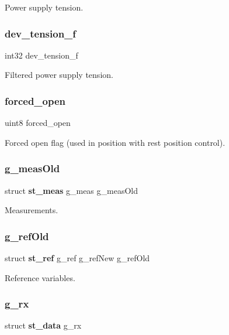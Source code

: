 Power supply tension. \mbox{\label{globals_8c_a600f1f02d397d3ffd8b03b8a4edace02}} 
\subsubsection{dev\+\_\+tension\+\_\+f}
{\footnotesize\ttfamily int32 dev\+\_\+tension\+\_\+f}

Filtered power supply tension. \mbox{\label{globals_8c_a0f13b80a0c329fa3176eb1e72ef36fb8}} 
\subsubsection{forced\+\_\+open}
{\footnotesize\ttfamily uint8 forced\+\_\+open}

Forced open flag (used in position with rest position control). \mbox{\label{globals_8c_a47c3980e6bddec492ca4315e36602ba0}} 
\subsubsection{g\+\_\+meas\+Old}
{\footnotesize\ttfamily struct \textbf{ st\+\_\+meas} g\+\_\+meas g\+\_\+meas\+Old}

Measurements. \mbox{\label{globals_8c_a158d26b6d15050b37d8039881d75e0dc}} 
\subsubsection{g\+\_\+ref\+Old}
{\footnotesize\ttfamily struct \textbf{ st\+\_\+ref} g\+\_\+ref g\+\_\+ref\+New g\+\_\+ref\+Old}

Reference variables. \mbox{\label{globals_8c_aa963ce8fafc11e104eb7ee22982d0345}} 
\subsubsection{g\+\_\+rx}
{\footnotesize\ttfamily struct \textbf{ st\+\_\+data} g\+\_\+rx}

